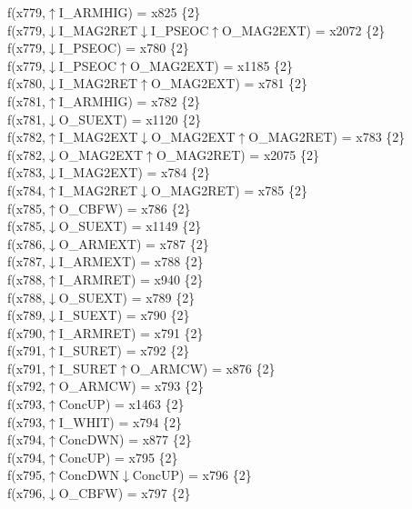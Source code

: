 f(x779,$\uparrow$I\_ARMHIG) = x825 \{2\} \\  
f(x779,$\downarrow$I\_MAG2RET$\downarrow$I\_PSEOC$\uparrow$O\_MAG2EXT) = x2072 \{2\} \\  
f(x779,$\downarrow$I\_PSEOC) = x780 \{2\} \\  
f(x779,$\downarrow$I\_PSEOC$\uparrow$O\_MAG2EXT) = x1185 \{2\} \\  
f(x780,$\downarrow$I\_MAG2RET$\uparrow$O\_MAG2EXT) = x781 \{2\} \\  
f(x781,$\uparrow$I\_ARMHIG) = x782 \{2\} \\  
f(x781,$\downarrow$O\_SUEXT) = x1120 \{2\} \\  
f(x782,$\uparrow$I\_MAG2EXT$\downarrow$O\_MAG2EXT$\uparrow$O\_MAG2RET) = x783 \{2\} \\  
f(x782,$\downarrow$O\_MAG2EXT$\uparrow$O\_MAG2RET) = x2075 \{2\} \\  
f(x783,$\downarrow$I\_MAG2EXT) = x784 \{2\} \\  
f(x784,$\uparrow$I\_MAG2RET$\downarrow$O\_MAG2RET) = x785 \{2\} \\  
f(x785,$\uparrow$O\_CBFW) = x786 \{2\} \\  
f(x785,$\downarrow$O\_SUEXT) = x1149 \{2\} \\  
f(x786,$\downarrow$O\_ARMEXT) = x787 \{2\} \\  
f(x787,$\downarrow$I\_ARMEXT) = x788 \{2\} \\  
f(x788,$\uparrow$I\_ARMRET) = x940 \{2\} \\  
f(x788,$\downarrow$O\_SUEXT) = x789 \{2\} \\  
f(x789,$\downarrow$I\_SUEXT) = x790 \{2\} \\  
f(x790,$\uparrow$I\_ARMRET) = x791 \{2\} \\  
f(x791,$\uparrow$I\_SURET) = x792 \{2\} \\  
f(x791,$\uparrow$I\_SURET$\uparrow$O\_ARMCW) = x876 \{2\} \\  
f(x792,$\uparrow$O\_ARMCW) = x793 \{2\} \\  
f(x793,$\uparrow$ConcUP) = x1463 \{2\} \\  
f(x793,$\uparrow$I\_WHIT) = x794 \{2\} \\  
f(x794,$\uparrow$ConcDWN) = x877 \{2\} \\  
f(x794,$\uparrow$ConcUP) = x795 \{2\} \\  
f(x795,$\uparrow$ConcDWN$\downarrow$ConcUP) = x796 \{2\} \\  
f(x796,$\downarrow$O\_CBFW) = x797 \{2\} \\  
